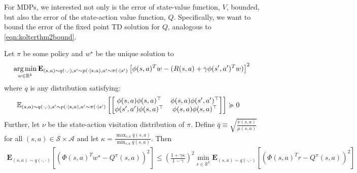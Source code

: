 For MDPs, we interested not only is the error of state-value function, $V$, bounded, but also the error of the state-action value function, $Q$.
Specifically, we want to bound the error of the fixed point TD solution for $Q$, analogous to \cref{eqn:kolterthm2bound}.
\begin{lemma}
  Let $\pi$ be some policy and $w^{\star}$ be the unique solution to
  \begin{align}
    \operatorname*{arg\,min}_{w \in \mathbb{R}^k} \mathbf{E}_{(s,a) \sim q(\cdot, \cdot), s' \sim p(\cdot|s,a), a'\sim \pi(\cdot|s')} \left[ \phi(s,a)^T w - (R(s, a) + \gamma \phi(s',a')^T w) \right]^2
  \end{align}
  where $q$ is any distribution satisfying:
  \begin{align}
    \mathbb{E}_{(s, a) \sim q(\cdot, \cdot), s'\sim p(\cdot|s, a), a' \sim \pi(\cdot|s')} &
    \left[\begin{bmatrix}
              \phi(s, a)\phi(s, a)^\top   & \phi(s, a)\phi(s', a')^\top \\
              \phi(s', a')\phi(s, a)^\top & \phi(s, a)\phi(s, a)^\top
            \end{bmatrix}\right] \succcurlyeq 0 \label{eqn:koldercondstate}
  \end{align}
  Further, let $\nu$ be the state-action visitation distribution of $\pi$.
  Define $\bar{q} \equiv \sqrt{\frac{\nu(s,a)}{\mu(s,a)} }$ for all $(s,a) \in \mathcal{S} \times \mathcal{A}$ and let $\kappa = \frac{\max_{s,a} \bar{q}(s,a)}{\min_{s,a} \bar{q}(s,a)}$.
  Then
  \begin{align}
    \mathbf{E}_{(s,a) \sim q(\cdot, \cdot)} \left [ (\Phi(s,a)^T w^{\star} - Q^\pi(s,a))^2 \right ] \leq \left( \frac{1+\gamma \kappa}{1-\gamma} \right)^2 \min_{r \in \mathbb{R}^k} \mathbf{E}_{(s,a) \sim q(\cdot, \cdot)} \left [ (\Phi(s,a)^T r - Q^\pi(s,a) )^2 \right ]
  \end{align}

\end{lemma}
